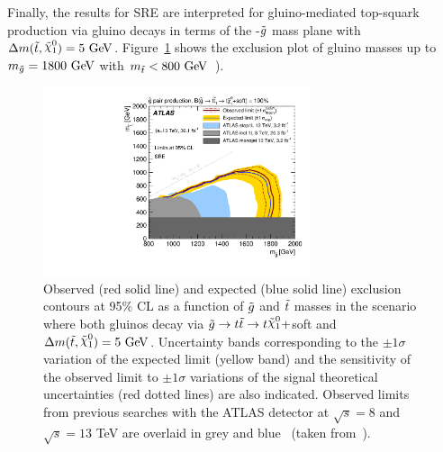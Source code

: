 			Finally, the results for SRE are interpreted for gluino-mediated top-squark production via gluino decays in terms of the \stop-$\tilde{g}$ mass plane with $\Delta m(\stop,\ninoone)=5\GeV$. Figure~\ref{fig:SRE_exclusion} shows the exclusion plot of gluino masses up to $m_{\gluino}=1800\GeV$ with $\mstop<800\GeV$~\cite{stop0L}).

			\begin{figure}[htpb]
			  \begin{center}
			    \includegraphics[width=0.7\textwidth]{figures/fit/SRE_exclusion}
			    \caption{Observed (red solid line) and expected (blue solid line)
			      exclusion contours at 95\% CL as a function
			      of $\tilde{g}$ and $\tilde{t}$ masses in the scenario where both
			      gluinos decay via $\gluino\to t\stop\to t\ninoone+$soft
			      and $\Delta m(\stop,\ninoone)=5\GeV$. Uncertainty bands corresponding to the $\pm 1
			      \sigma$ variation of the expected limit (yellow band) and the
			      sensitivity of the observed limit to $\pm 1\sigma$ variations of
			      the signal theoretical uncertainties (red dotted lines) are also
			      indicated. Observed limits from previous searches with the ATLAS detector at $\sqrt{s}=8$ and $\sqrt{s}=13$ TeV are overlaid in grey and blue~\cite{stop1L,Gtc1L,GtcMonojet} (taken from~\cite{stop0L}).}
			    \label{fig:SRE_exclusion}
			  \end{center}
			\end{figure}
